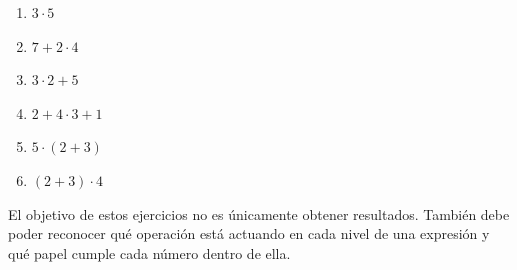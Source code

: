 \begin{enumerate}
\item \(3\cdot5\)
\item \(7+2\cdot4\)
\item \(3\cdot2+5\)
\item \(2+4\cdot3+1\)
\item \(5\cdot(2+3)\)
\item \((2+3)\cdot4\)
\end{enumerate}

El objetivo de estos ejercicios no es únicamente obtener resultados. También debe poder reconocer qué operación está actuando en cada nivel de una expresión y qué papel cumple cada número dentro de ella.

